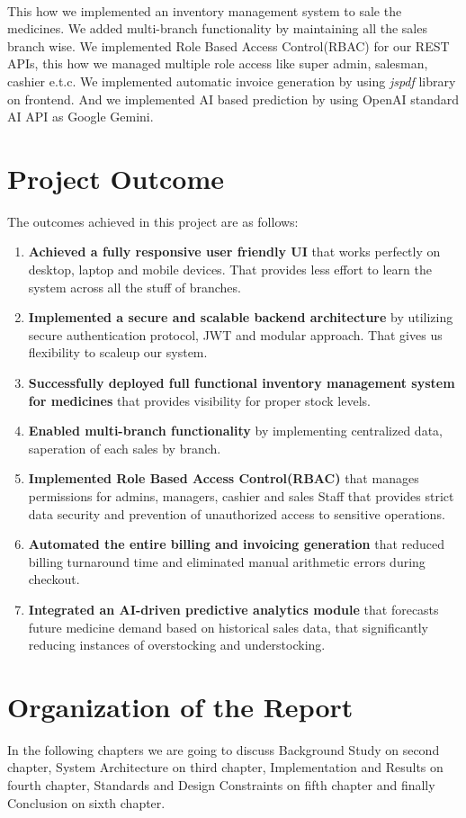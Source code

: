 \\
This how we implemented an inventory management system to sale the medicines. We added multi-branch functionality by maintaining all the sales branch wise. We implemented Role Based Access Control(RBAC) for our REST APIs, this how we managed multiple role access like super admin, salesman, cashier e.t.c. We implemented automatic invoice generation by using \textit{jspdf} library on frontend. And we implemented AI based prediction by using OpenAI standard AI API as Google Gemini. 
\section{Project Outcome}
The outcomes achieved in this project are as follows:

\begin{enumerate}
    \item \textbf{Achieved a fully responsive user friendly UI} that works perfectly on desktop, laptop and mobile devices. That provides less effort to learn the system across all the stuff of branches.
    \item \textbf{Implemented a secure and scalable backend architecture} by utilizing secure authentication protocol, JWT and modular approach. That gives us flexibility to scaleup our system.
    \item \textbf{Successfully deployed full functional inventory management system for medicines} that provides visibility for proper stock levels.
    \item \textbf{Enabled multi-branch functionality} by implementing centralized data, saperation of each sales by branch.
    \item \textbf{Implemented Role Based Access Control(RBAC)} that manages permissions for admins, managers, cashier and sales Staff that provides strict data security and prevention of unauthorized access to sensitive operations.
    \item \textbf{Automated the entire billing and invoicing generation} that reduced billing turnaround time and eliminated manual arithmetic errors during checkout.
    \item \textbf{Integrated an AI-driven predictive analytics module}  that forecasts future medicine demand based on historical sales data, that significantly reducing instances of overstocking and understocking.
\end{enumerate}
\section{Organization of the Report}
In the following chapters we are going to discuss Background Study on second chapter, System Architecture on third chapter, Implementation and Results on fourth chapter, Standards and Design Constraints on fifth chapter and finally Conclusion on sixth chapter. 
